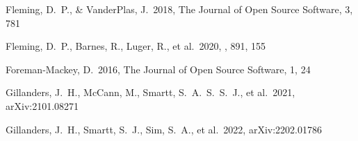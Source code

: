 \documentclass[twocolumn, twocolappendix]{aastex63}
\begin{document}
\begin{thebibliography}{}




 Fleming, D.~P., \& VanderPlas, J.\ 2018, The Journal of Open Source Software, 3, 781


 Fleming, D.~P., Barnes, R., Luger, R., et al.\ 2020, \apj, 891, 155






 Foreman-Mackey, D.\ 2016, The Journal of Open Source Software, 1, 24







 




 Gillanders, J.~H., McCann, M., Smartt, S.~A.~S.~S.~J., et al.\ 2021, arXiv:2101.08271


 Gillanders, J.~H., Smartt, S.~J., Sim, S.~A., et al.\ 2022, arXiv:2202.01786





\end{thebibliography}
\end{document}
